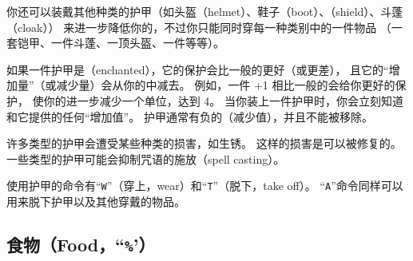 \documentclass[a4paper, 10pt]{article}
\newcommand{\nd}{\noindent}
\begin{document}
\nd 你还可以装戴其他种类的护甲（如头盔（helmet）、鞋子（boot）、\zhTransShield（shield）、斗蓬（cloak））
来进一步降低你的\zhTransArmorClass，不过你只能同时穿每一种类别中的一件物品
（一套铠甲、一件斗蓬、一顶头盔、一件\zhTransShield{}等等）。

如果一件护甲是\zhTransEnchanted（enchanted），它的保护会比一般的更好（或更差），
且它的“增加量”（或减少量）会从你的\zhTransArmorClass{}中减去。
例如，一件 +1 \zhTransChainMail{}相比一般的\zhTransChainMail{}会给你更好的保护，
使你的\zhTransArmorClass{}进一步减少一个单位，达到 4。
当你装上一件护甲时，你会立刻知道\zhTransArmorClass{}和它提供的任何“增加值”。
\zhTransCursed{}护甲通常有负的\zhTransEnchantments（减少值），并且不能被移除。

许多类型的护甲会遭受某些种类的损害，如生锈。
这样的损害是可以被修复的。
一些类型的护甲可能会抑制咒语的施放（spell casting）。

使用护甲的命令有“{\tt W}”（穿上，wear）和“{\tt T}”（脱下，take off）。
“{\tt A}”命令同样可以用来脱下护甲以及其他穿戴的物品。

\subsection*{食物（Food，“{\tt \%}'）}
\end{document}
